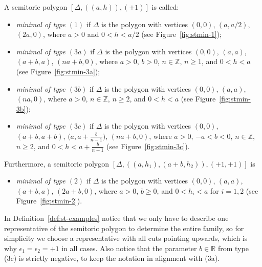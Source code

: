 \documentclass[10pt,a4paper]{amsart}
\numberwithin{equation}{section}
\def\R{{\mathbb R}}
\def\Z{{\mathbb Z}}
\newcommand{\De}{\Delta}
\theoremstyle{definition}
\theoremstyle{plain}
\theoremstyle{plain}
\begin{document}
\begin{Definition}
\label{def:st-examples}
A semitoric polygon $[\De,((a,h)),(+1)]$ is called:
\begin{itemize}\itemsep=0pt
 \item \emph{minimal of type $(1)$} if $\De$ is the polygon with vertices $(0,0)$, $(a,a/2)$, $(2a,0)$, where $a>0$ and $0<h<a/2$ (see Figure~\ref{fig:stmin-1});
 \item \emph{minimal of type $(3a)$} if $\De$ is the polygon with vertices $(0,0)$, $(a,a)$, $(a+b,a)$, $(na+b, 0)$,
 where $a>0$, $b>0$, $n\in\Z$, $n\geq 1$, and $0<h<a$ (see Figure~\ref{fig:stmin-3a});
 \item \emph{minimal of type $(3b)$} if $\De$ is the polygon with vertices $(0,0)$, $(a,a)$, $(na, 0)$,
 where $a>0$, $n\in\Z$, $n\geq 2$, and $0<h<a$ (see Figure~\ref{fig:stmin-3b});
 \item \emph{minimal of type $(3c)$} if $\De$ is the polygon with vertices $(0,0)$, $(a+b,a+b)$, $\big(a,a+\frac{b}{n-1}\big)$, $(na+b,0)$,
 where $a>0$, $-a<b<0$, $n\in\Z$, $n\geq 2$, and $0<h<a+\frac{b}{n-1}$ (see Figure~\ref{fig:stmin-3c}).
\end{itemize}
Furthermore, a semitoric polygon $[\De,((a,h_1), (a+b,h_2)),(+1,+1)]$ is
\begin{itemize}\itemsep=0pt
 \item \emph{minimal of type $(2)$} if $\De$ is the polygon with vertices $(0,0)$, $(a,a)$, $(a+b,a)$, $(2a+b,0)$,
 where $a>0$, $b\geq 0$, and $0<h_i<a$ for $i=1,2$ (see Figure~\ref{fig:stmin-2}).
\end{itemize}
\end{Definition}


In Definition~\ref{def:st-examples} notice that we only have to describe one representative of the semitoric polygon to determine the entire family, so for simplicity we choose a representative with all cuts pointing upwards, which is why $\epsilon_1=\epsilon_2=+1$ in all cases.
Also notice that the parameter $b\in\R$ from type (3c) is strictly negative, to keep the notation in alignment with (3a).
\end{document}
